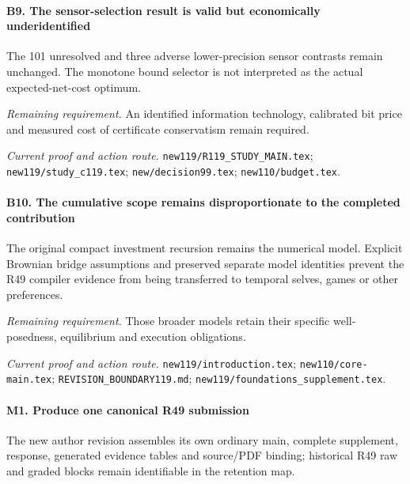 \paragraph{B9. The sensor-selection result is valid but economically underidentified}

The 101 unresolved and three adverse lower-precision sensor contrasts remain unchanged. The monotone bound selector is not interpreted as the actual expected-net-cost optimum.

\par\emph{Remaining requirement.} An identified information technology, calibrated bit price and measured cost of certificate conservatism remain required.

\par\emph{Current proof and action route.} \nolinkurl{new119/R119_STUDY_MAIN.tex}; \nolinkurl{new119/study_c119.tex}; \nolinkurl{new/decision99.tex}; \nolinkurl{new110/budget.tex}.

\paragraph{B10. The cumulative scope remains disproportionate to the completed contribution}

The original compact investment recursion remains the numerical model. Explicit Brownian bridge assumptions and preserved separate model identities prevent the R49 compiler evidence from being transferred to temporal selves, games or other preferences.

\par\emph{Remaining requirement.} Those broader models retain their specific well-posedness, equilibrium and execution obligations.

\par\emph{Current proof and action route.} \nolinkurl{new119/introduction.tex}; \nolinkurl{new110/core-main.tex}; \nolinkurl{REVISION_BOUNDARY119.md}; \nolinkurl{new119/foundations_supplement.tex}.

\paragraph{M1. Produce one canonical R49 submission}

The new author revision assembles its own ordinary main, complete supplement, response, generated evidence tables and source/\allowbreak{}PDF binding; historical R49 raw and graded blocks remain identifiable in the retention map.

